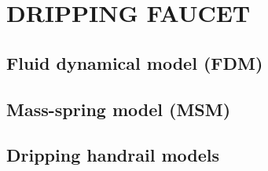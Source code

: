\chapter{DRIPPING FAUCET}
\label{chap:dripping_faucet}




\section{Fluid dynamical model (FDM)}
\section{Mass-spring model (MSM)} \label{section:msm}
\section{Dripping handrail models}











%
%
%
